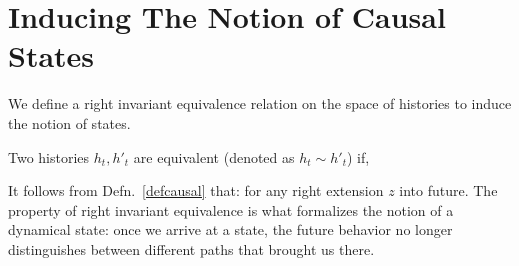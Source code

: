 \documentclass[twocolumn, compsoc,9pt]{IEEEtran}
\begin{document}
{\section{Inducing The Notion of Causal States}
We define a right invariant equivalence relation on the space of histories to induce the notion of states.
\begin{defn}\label{defcausal}
Two histories $h_t,h'_t$ are equivalent (denoted as $h_t \sim h'_t$) if,
\end{defn}
It follows from Defn.~\ref{defcausal} that:
for any right extension $z$ into future. The property of right invariant equivalence is what 
formalizes the notion of a dynamical state: once we arrive at a state, the future behavior 
no longer distinguishes between different paths that brought us there. 


}%

\begin{figure}[b]
\centering


\end{figure}





\end{document}
